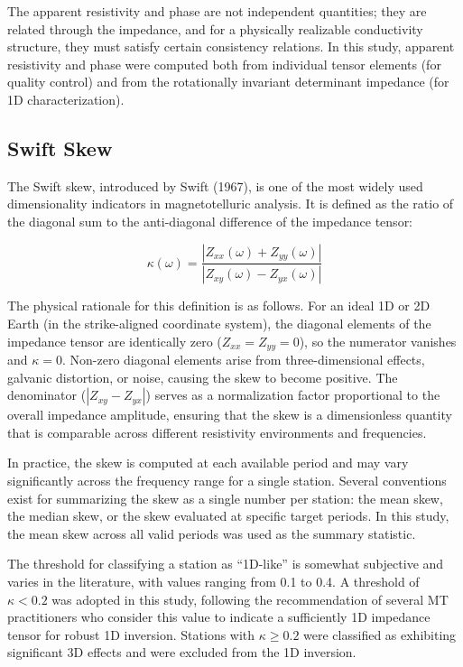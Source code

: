 The apparent resistivity and phase are not independent quantities; they are related through the impedance, and for a physically realizable conductivity structure, they must satisfy certain consistency relations. In this study, apparent resistivity and phase were computed both from individual tensor elements (for quality control) and from the rotationally invariant determinant impedance (for 1D characterization).

\subsection{Swift Skew}

The Swift skew, introduced by Swift (1967), is one of the most widely used dimensionality indicators in magnetotelluric analysis. It is defined as the ratio of the diagonal sum to the anti-diagonal difference of the impedance tensor:

\begin{equation}
\kappa(\omega) = \frac{|Z_{xx}(\omega) + Z_{yy}(\omega)|}{|Z_{xy}(\omega) - Z_{yx}(\omega)|}
\end{equation}

The physical rationale for this definition is as follows. For an ideal 1D or 2D Earth (in the strike-aligned coordinate system), the diagonal elements of the impedance tensor are identically zero ($Z_{xx} = Z_{yy} = 0$), so the numerator vanishes and $\kappa = 0$. Non-zero diagonal elements arise from three-dimensional effects, galvanic distortion, or noise, causing the skew to become positive. The denominator ($|Z_{xy} - Z_{yx}|$) serves as a normalization factor proportional to the overall impedance amplitude, ensuring that the skew is a dimensionless quantity that is comparable across different resistivity environments and frequencies.

In practice, the skew is computed at each available period and may vary significantly across the frequency range for a single station. Several conventions exist for summarizing the skew as a single number per station: the mean skew, the median skew, or the skew evaluated at specific target periods. In this study, the mean skew across all valid periods was used as the summary statistic.

The threshold for classifying a station as ``1D-like'' is somewhat subjective and varies in the literature, with values ranging from 0.1 to 0.4. A threshold of $\kappa < 0.2$ was adopted in this study, following the recommendation of several MT practitioners who consider this value to indicate a sufficiently 1D impedance tensor for robust 1D inversion. Stations with $\kappa \geq 0.2$ were classified as exhibiting significant 3D effects and were excluded from the 1D inversion.

